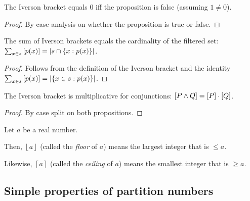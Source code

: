 \begin{lemma}
\label{lem.pars.iverson-eq-zero-iff}
\leanhelper
\leanok
The Iverson bracket equals $0$ iff the proposition is false (assuming $1 \neq 0$).
\end{lemma}

\begin{proof}
\leanok
By case analysis on whether the proposition is true or false.
\end{proof}

\begin{lemma}
\label{lem.pars.sum-iverson-eq-card}
\leanhelper
\leanok
The sum of Iverson brackets equals the cardinality of the filtered set:
$\sum_{x \in s} \left[ p(x) \right] = |s \cap \{x : p(x)\}|$.
\end{lemma}

\begin{proof}
\leanok
Follows from the definition of the Iverson bracket and the identity
$\sum_{x \in s} \left[ p(x) \right] = |\{x \in s : p(x)\}|$.
\end{proof}

\begin{lemma}
\label{lem.pars.iverson-and}
\leanhelper
\leanok
The Iverson bracket is multiplicative for conjunctions:
$\left[ P \wedge Q \right] = \left[ P \right] \cdot \left[ Q \right]$.
\end{lemma}

\begin{proof}
\leanok
By case split on both propositions.
\end{proof}

\begin{definition}
\label{def.pars.floor-ceil}
\leantarget
\leanok
Let $a$ be a real number.

Then, $\left\lfloor a\right\rfloor $ (called the \emph{floor} of $a$) means
the largest integer that is $\leq a$.

Likewise, $\left\lceil a\right\rceil $ (called the \emph{ceiling} of $a$)
means the smallest integer that is $\geq a$.
\end{definition}

\subsection{Simple properties of partition numbers}

